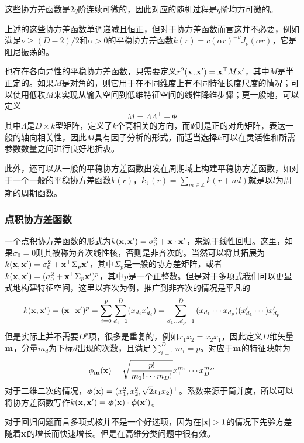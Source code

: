 \documentclass[12pt,UTF8]{article}
\begin{document}
                这些协方差函数是$2q$阶连续可微的，因此对应的随机过程是$q$阶均方可微的。\par
                上述的这些协方差函数单调递减且恒正，但对于协方差函数而言这并不必要，例如满足$\nu\geqslant(D-2)/2$和$\alpha>0$的平稳协方差函数$k(r)=c(\alpha r)^{-\nu}J_\nu(\alpha r)$，它是阻尼振荡的。\par
                也存在各向异性的平稳协方差函数，只需要定义$r^2(\vb{x},\vb{x}')=\vb{x}^\top M\vb{x}'$，其中$M$是半正定的。如果$M$是对角的，则它用于在不同维度上有不同特征长度尺度的情况；可以使用低秩$M$来实现从输入空间到低维特征空间的线性降维步骤；更一般地，可以定义
                \begin{equation}
                    M=\Lambda\Lambda^\top+\Psi
                \end{equation}
                其中$\Lambda$是$D\times k$型矩阵，定义了$k$个高相关的方向，而$\Psi$则是正的对角矩阵，表达一般的轴向相关性，因此$M$具有因子分析的形式，而适当选择$k$可以在灵活性和所需参数数量之间进行良好地折衷。\par
                此外，还可以从一般的平稳协方差函数出发在周期域上构建平稳协方差函数，如对于一个一般的平稳协方差函数$k(r)$，$k_\mathbb{T}(r)=\sum_{m\in\mathbb{Z}}{k(r+ml)}$就是以$l$为周期的周期函数。
            \subsubsection{点积协方差函数}
                一个点积协方差函数的形式为$k(\vb{x},\vb{x}')=\sigma_0^2+\vb{x}\cdot\vb{x}'$，来源于线性回归。这里，如果$\sigma_0=0$则其被称为齐次线性核，否则是非齐次的。当然可以将其拓展为$k(\vb{x},\vb{x}')=\sigma_0^2+\vb{x}^\top\Sigma_p\vb{x}'$，其中$\Sigma_p$是一般的协方差矩阵，或者$k(\vb{x},\vb{x}')=(\sigma_0^2+\vb{x}^\top\Sigma_p\vb{x}')^p$，其中$p$是一个正整数。但是对于多项式我们可以更显式地构建特征空间，这里以齐次为例，推广到非齐次的情况是平凡的
                \begin{equation}
                    k(\vb{x},\vb{x}')=(\vb{x}\cdot\vb{x}')^p=\sum_{i=0}^p{\sum_{d_i=1}^D(x_{d_i}x'_{d_i})}=\sum_{d_1\dots d_p=1}^D{(x_{d_1}\cdots x_{d_p})(x'_{d_1}\cdots)x'_{d_p}}
                \end{equation}
                但是实际上并不需要$D^p$项，很多是重复的，例如$x_1x_2=x_2x_1$，因此定义$D$维矢量$\vb{m}$，分量$m_d$为下标$d$出现的次数，且满足$\sum_{i=1}^D{m_i}=p$。对应于$\vb{m}$的特征映射为
                \begin{equation}
                    \phi_{\vb{m}}(\vb{x})=\sqrt{\frac{p!}{m_1!\cdots m_D!}}x_1^{m_1}\cdots x_D^{m_D}
                \end{equation}
                对于二维二次的情况，$\vb*{\phi}(\vb{x})=(x_1^2,x_2^2,\sqrt{2}x_1x_2)^\top$。系数来源于简并度，所以可以将协方差函数写作$k(\vb{x},\vb{x}')=\vb*{\phi}(\vb{x})\cdot\vb*{\phi}(\vb{x}')$。\par
                对于回归问题而言多项式核并不是一个好选项，因为在$\abs{\vb{x}}>1$的情况下先验方差随着$\vb{x}$的增长而快速增长。但是在高维分类问题中很有效。
\end{document}
